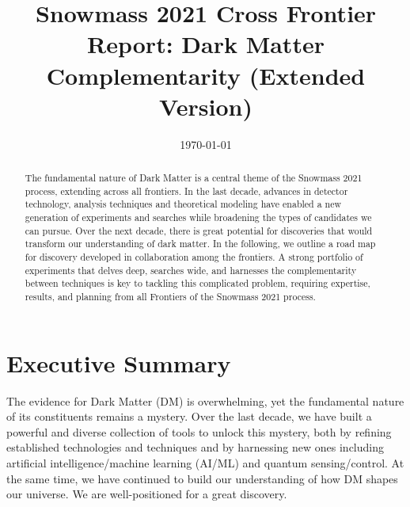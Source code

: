 \documentclass[nofootinbib]{article}
\title{Snowmass 2021 Cross Frontier Report: Dark Matter Complementarity (Extended Version)}
\date{\today}
\begin{document}
\maketitle

\begin{abstract}
The fundamental nature of Dark Matter is a central theme of the Snowmass 2021 process, extending across all frontiers. In the last decade, advances in detector technology, analysis techniques and theoretical modeling have enabled a new generation of experiments and searches while broadening the types of candidates we can pursue. Over the next decade, there is great potential for discoveries that would transform our understanding of dark matter. In the following, we outline a road map for discovery developed in collaboration among the frontiers. A strong portfolio of experiments that delves deep, searches wide, and harnesses the complementarity between techniques is key to tackling this complicated problem, requiring expertise, results, and planning from all Frontiers of the Snowmass 2021 process. 

\end{abstract}

\newpage

\section*{Executive Summary}
The evidence for Dark Matter (DM) is overwhelming, yet the fundamental nature of its constituents remains a mystery. Over the last decade, we have built a powerful and diverse collection of tools to unlock this mystery, both by refining established technologies and techniques and by harnessing new ones including artificial intelligence/machine learning (AI/ML) and quantum sensing/control. At the same time, we have continued to build our understanding of how DM shapes our universe. We are well-positioned for a great discovery.
\end{document}

